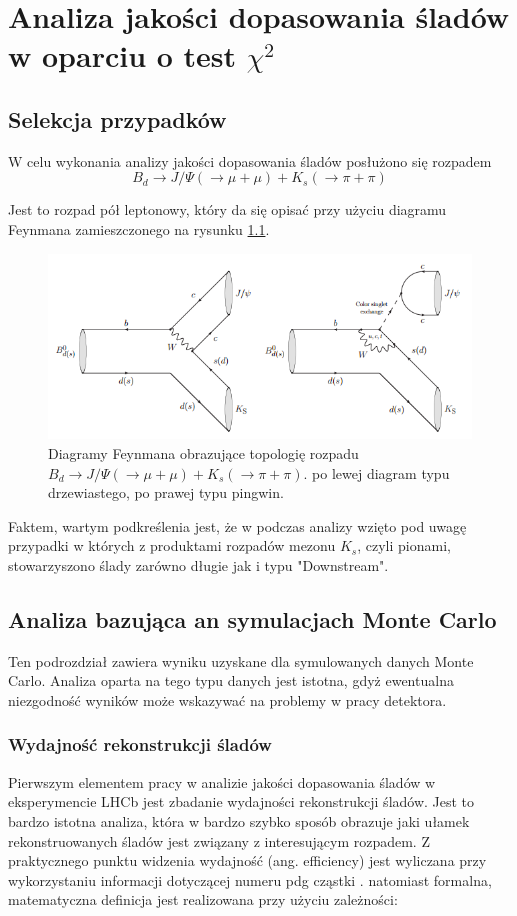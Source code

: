 \chapter{Analiza jakości dopasowania śladów w oparciu o test $\chi^2$}
\section{Selekcja przypadków}
W celu wykonania analizy jakości dopasowania śladów posłużono się rozpadem 
\begin{equation}
B_d \rightarrow J/\Psi(\rightarrow \mu +\mu) + K_s(\rightarrow \pi + \pi )
\end{equation}

Jest to rozpad pół leptonowy, który da się opisać przy użyciu diagramu Feynmana zamieszczonego na rysunku \ref{rys:BJPsi}.

 \begin{figure}[h]
 \centering
 \includegraphics[scale=0.8]{rozdzial6/Feynman.png}
 \caption{Diagramy Feynmana obrazujące topologię rozpadu $B_d \rightarrow J/\Psi(\rightarrow \mu +\mu) + K_s(\rightarrow \pi + \pi )$. po lewej diagram typu drzewiastego, po prawej typu pingwin. }
 \label{rys:BJPsi}
\end{figure}

Faktem, wartym podkreślenia jest, że w podczas analizy wzięto pod uwagę przypadki w których z produktami rozpadów mezonu $K_s$, czyli pionami, stowarzyszono ślady zarówno długie jak i typu "Downstream".
\section{Analiza bazująca an symulacjach Monte Carlo} 
Ten podrozdział zawiera wyniku uzyskane dla symulowanych danych Monte Carlo. Analiza oparta na tego typu danych jest istotna, gdyż ewentualna niezgodność wyników może wskazywać na problemy w pracy detektora. 
\subsection{Wydajność rekonstrukcji śladów}
Pierwszym elementem pracy w analizie jakości dopasowania śladów w eksperymencie LHCb jest zbadanie wydajności rekonstrukcji śladów. Jest to bardzo istotna analiza, która w bardzo szybko sposób obrazuje jaki ułamek rekonstruowanych śladów jest związany z interesującym rozpadem. Z praktycznego punktu widzenia wydajność (ang. efficiency) jest wyliczana przy wykorzystaniu informacji dotyczącej numeru pdg cząstki \cite{PDG}. natomiast formalna, matematyczna definicja jest realizowana przy użyciu zależności:

